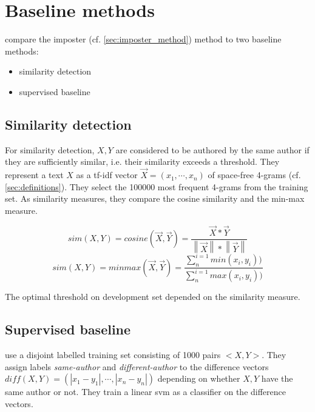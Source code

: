 \section{Baseline methods}
\label{sec:imposter_baseline_methods}

\citet{koppel_determining_2014} compare the imposter (cf. \autoref{sec:imposter_method}) method to two baseline methods:
\begin{itemize}
    \item similarity detection
    \item supervised baseline
\end{itemize}


\subsection{Similarity detection}
\label{sec:imp_similarity_detection}

For similarity detection, $X,Y$ are considered to be authored by the same author if they are sufficiently similar, 
i.e. their similarity exceeds a threshold.
They represent a text $X$ as a tf-idf vector $\overrightarrow{X}= (x_1, \cdots , x_n)$ 
of space-free 4-grams (cf. \autoref{sec:definitions}).
They select the 100000 most frequent 4-grams from the training set.
As similarity measures, they compare the cosine similarity and the min-max measure.

$$sim(X,Y)=cosine(\overrightarrow{X},\overrightarrow{Y})=\frac{\overrightarrow{X}*\overrightarrow{Y}}{\left\| \overrightarrow{X} \right\|*\left\| \overrightarrow{Y} \right\|}$$
$$sim(X,Y)=minmax(\overrightarrow{X},\overrightarrow{Y})=\frac{\sum_{n}^{i=1}min(x_i,y_i))}{\sum_{n}^{i=1}max(x_i,y_i))}$$

The optimal threshold on \citet{koppel_determining_2014} development set depended on the similarity measure.


\subsection{Supervised baseline}
\label{sec:imp_supervised_baseline}

\citet{koppel_determining_2014} use a disjoint labelled training set consisting of 1000 pairs $<X,Y>$.
They assign labels \textit{same-author} and \textit{different-author} 
to the difference vectors $diff(X,Y)= (\left| x_1-y_1 \right|, \cdots , \left| x_n-y_n \right|)$ 
depending on whether $X,Y$ have the same author or not.
They train a linear \ac{svm} as a classifier on the difference vectors.
